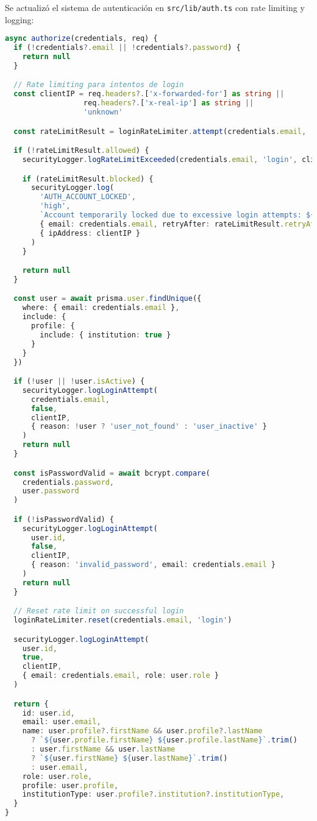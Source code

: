 \documentclass[12pt,a4paper]{article}
\begin{document}
Se actualizó el sistema de autenticación en \texttt{src/lib/auth.ts} con rate limiting y logging:

\begin{lstlisting}[language=TypeScript, caption=Autenticación con Seguridad Mejorada]
async authorize(credentials, req) {
  if (!credentials?.email || !credentials?.password) {
    return null
  }

  // Rate limiting para intentos de login
  const clientIP = req.headers?.['x-forwarded-for'] as string ||
                  req.headers?.['x-real-ip'] as string ||
                  'unknown'

  const rateLimitResult = loginRateLimiter.attempt(credentials.email, 'login')

  if (!rateLimitResult.allowed) {
    securityLogger.logRateLimitExceeded(credentials.email, 'login', clientIP)

    if (rateLimitResult.blocked) {
      securityLogger.log(
        'AUTH_ACCOUNT_LOCKED',
        'high',
        `Account temporarily locked due to excessive login attempts: ${credentials.email}`,
        { email: credentials.email, retryAfter: rateLimitResult.retryAfter },
        { ipAddress: clientIP }
      )
    }

    return null
  }

  const user = await prisma.user.findUnique({
    where: { email: credentials.email },
    include: {
      profile: {
        include: { institution: true }
      }
    }
  })

  if (!user || !user.isActive) {
    securityLogger.logLoginAttempt(
      credentials.email,
      false,
      clientIP,
      { reason: !user ? 'user_not_found' : 'user_inactive' }
    )
    return null
  }

  const isPasswordValid = await bcrypt.compare(
    credentials.password,
    user.password
  )

  if (!isPasswordValid) {
    securityLogger.logLoginAttempt(
      user.id,
      false,
      clientIP,
      { reason: 'invalid_password', email: credentials.email }
    )
    return null
  }

  // Reset rate limit on successful login
  loginRateLimiter.reset(credentials.email, 'login')

  securityLogger.logLoginAttempt(
    user.id,
    true,
    clientIP,
    { email: credentials.email, role: user.role }
  )

  return {
    id: user.id,
    email: user.email,
    name: user.profile?.firstName && user.profile?.lastName
      ? `${user.profile.firstName} ${user.profile.lastName}`.trim()
      : user.firstName && user.lastName
      ? `${user.firstName} ${user.lastName}`.trim()
      : user.email,
    role: user.role,
    profile: user.profile,
    institutionType: user.profile?.institution?.institutionType,
  }
}
\end{lstlisting}
\end{document}
